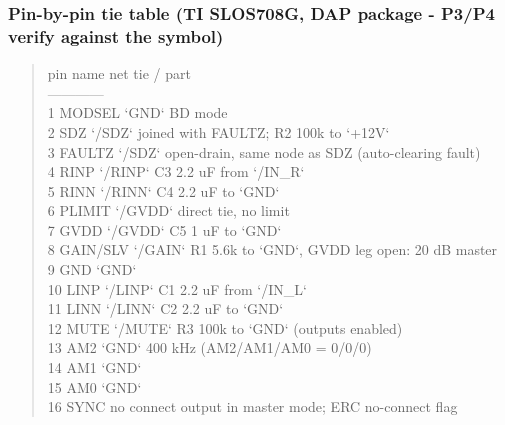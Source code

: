 \documentclass[11pt,a4paper]{article}
\begin{document}
\subsubsection*{Pin-by-pin tie table (TI SLOS708G, DAP package - P3/P4 verify against the symbol)}
\begin{quote}\small\ttfamily\raggedright
\textbar{} pin \textbar{} name \textbar{} net \textbar{} tie / part \textbar{}\\
\textbar{}---\textbar{}---\textbar{}---\textbar{}---\textbar{}\\
\textbar{} 1 \textbar{} MODSEL \textbar{} `GND` \textbar{} BD mode \textbar{}\\
\textbar{} 2 \textbar{} SDZ \textbar{} `/SDZ` \textbar{} joined with FAULTZ; R2 100k to `+12V` \textbar{}\\
\textbar{} 3 \textbar{} FAULTZ \textbar{} `/SDZ` \textbar{} open-drain, same node as SDZ (auto-clearing fault) \textbar{}\\
\textbar{} 4 \textbar{} RINP \textbar{} `/RINP` \textbar{} C3 2.2 uF from `/IN\_R` \textbar{}\\
\textbar{} 5 \textbar{} RINN \textbar{} `/RINN` \textbar{} C4 2.2 uF to `GND` \textbar{}\\
\textbar{} 6 \textbar{} PLIMIT \textbar{} `/GVDD` \textbar{} direct tie, no limit \textbar{}\\
\textbar{} 7 \textbar{} GVDD \textbar{} `/GVDD` \textbar{} C5 1 uF to `GND` \textbar{}\\
\textbar{} 8 \textbar{} GAIN/SLV \textbar{} `/GAIN` \textbar{} R1 5.6k to `GND`, GVDD leg open: 20 dB master \textbar{}\\
\textbar{} 9 \textbar{} GND \textbar{} `GND` \textbar{} \textbar{}\\
\textbar{} 10 \textbar{} LINP \textbar{} `/LINP` \textbar{} C1 2.2 uF from `/IN\_L` \textbar{}\\
\textbar{} 11 \textbar{} LINN \textbar{} `/LINN` \textbar{} C2 2.2 uF to `GND` \textbar{}\\
\textbar{} 12 \textbar{} MUTE \textbar{} `/MUTE` \textbar{} R3 100k to `GND` (outputs enabled) \textbar{}\\
\textbar{} 13 \textbar{} AM2 \textbar{} `GND` \textbar{} 400 kHz (AM2/AM1/AM0 = 0/0/0) \textbar{}\\
\textbar{} 14 \textbar{} AM1 \textbar{} `GND` \textbar{} \textbar{}\\
\textbar{} 15 \textbar{} AM0 \textbar{} `GND` \textbar{} \textbar{}\\
\textbar{} 16 \textbar{} SYNC \textbar{} no connect \textbar{} output in master mode; ERC no-connect flag \textbar{}\\

\end{quote}
\end{document}

